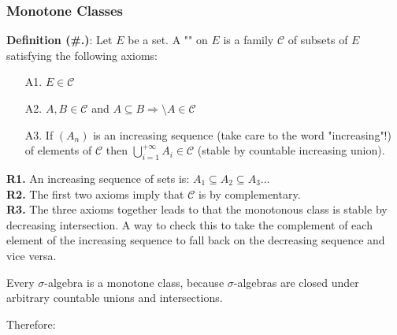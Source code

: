 	\pagebreak
	\subsubsection{Monotone Classes}
	\textbf{Definition (\#\thesection.\mydef)}: Let $E$ be a set. A "" on $E$ is a family $\mathcal{C}$ of subsets of $E$ satisfying the following axioms:
	\begin{enumerate}
		\item[A1.] $E\in \mathcal{C}$
		\item[A2.] $A,B\in \mathcal{C}$ and $A\subseteq B \Rightarrow \setminus A\in \mathcal{C}$
		\item[A3.] If $(A_n)$ is an increasing sequence (take care to the word "increasing"!) of elements of $\mathcal{C}$ then $\displaystyle\bigcup_{i=1}^{+\infty} A_i\in \mathcal{C}$ (stable by countable increasing union).
	\end{enumerate}
	\begin{tcolorbox}[title=Remarks,arc=10pt,breakable,drop lifted shadow,
  skin=enhanced,
  skin first is subskin of={enhancedfirst}{arc=10pt,no shadow},
  skin middle is subskin of={enhancedmiddle}{arc=10pt,no shadow},
  skin last is subskin of={enhancedlast}{drop lifted shadow}]
	\textbf{R1.} An increasing sequence of sets is: $A_1\subseteq A_2\subseteq A_3 \ldots $\\
	
	\textbf{R2.} The first two axioms imply that $\mathcal{C}$ is by complementary.\\
	
	\textbf{R3.} The three axioms together leads to that the monotonous class is stable by decreasing intersection. A way to check this to take the complement of each element of the increasing sequence to fall back on the decreasing sequence and vice versa.
	\end{tcolorbox}
	Every $\sigma$-algebra is a monotone class, because $\sigma$-algebras are closed under arbitrary countable unions and intersections.
	
	Therefore:
	
